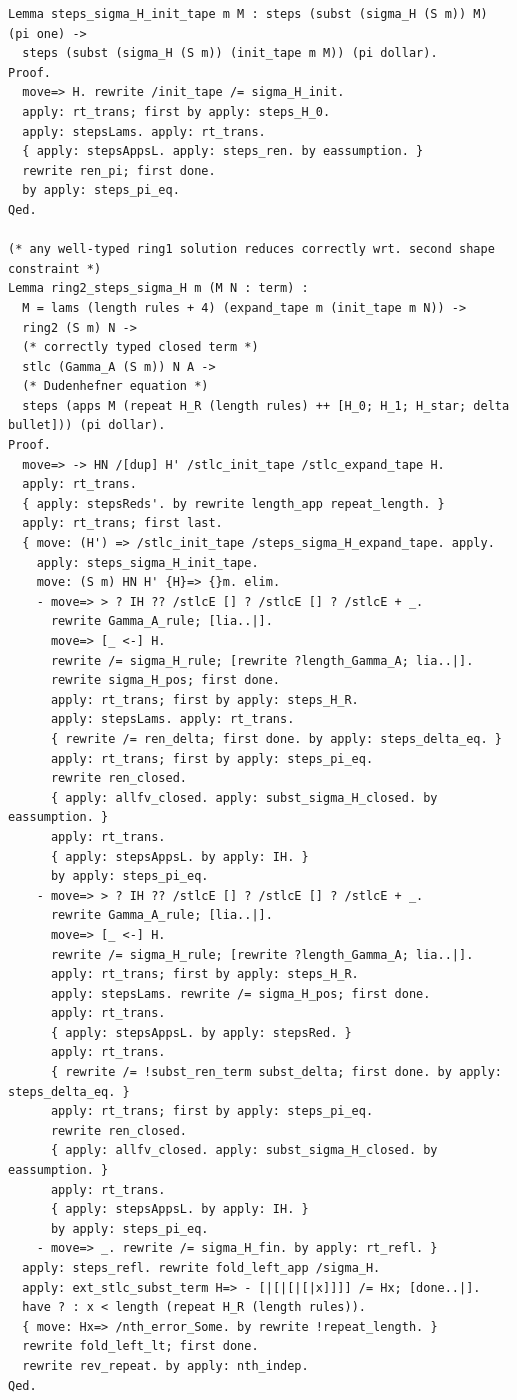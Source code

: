 \documentclass[10pt,a4paper]{amsart}
\begin{document}
\begin{lstlisting}
Lemma steps_sigma_H_init_tape m M : steps (subst (sigma_H (S m)) M) (pi one) ->
  steps (subst (sigma_H (S m)) (init_tape m M)) (pi dollar).
Proof.
  move=> H. rewrite /init_tape /= sigma_H_init.
  apply: rt_trans; first by apply: steps_H_0.
  apply: stepsLams. apply: rt_trans.
  { apply: stepsAppsL. apply: steps_ren. by eassumption. }
  rewrite ren_pi; first done.
  by apply: steps_pi_eq.
Qed.

(* any well-typed ring1 solution reduces correctly wrt. second shape constraint *)
Lemma ring2_steps_sigma_H m (M N : term) :
  M = lams (length rules + 4) (expand_tape m (init_tape m N)) ->
  ring2 (S m) N ->
  (* correctly typed closed term *)
  stlc (Gamma_A (S m)) N A ->
  (* Dudenhefner equation *)
  steps (apps M (repeat H_R (length rules) ++ [H_0; H_1; H_star; delta bullet])) (pi dollar).
Proof.
  move=> -> HN /[dup] H' /stlc_init_tape /stlc_expand_tape H.
  apply: rt_trans.
  { apply: stepsReds'. by rewrite length_app repeat_length. }
  apply: rt_trans; first last.
  { move: (H') => /stlc_init_tape /steps_sigma_H_expand_tape. apply.
    apply: steps_sigma_H_init_tape.
    move: (S m) HN H' {H}=> {}m. elim.
    - move=> > ? IH ?? /stlcE [] ? /stlcE [] ? /stlcE + _.
      rewrite Gamma_A_rule; [lia..|].
      move=> [_ <-] H.
      rewrite /= sigma_H_rule; [rewrite ?length_Gamma_A; lia..|].
      rewrite sigma_H_pos; first done.
      apply: rt_trans; first by apply: steps_H_R.
      apply: stepsLams. apply: rt_trans.
      { rewrite /= ren_delta; first done. by apply: steps_delta_eq. }
      apply: rt_trans; first by apply: steps_pi_eq.
      rewrite ren_closed.
      { apply: allfv_closed. apply: subst_sigma_H_closed. by eassumption. }
      apply: rt_trans.
      { apply: stepsAppsL. by apply: IH. }
      by apply: steps_pi_eq.
    - move=> > ? IH ?? /stlcE [] ? /stlcE [] ? /stlcE + _.
      rewrite Gamma_A_rule; [lia..|].
      move=> [_ <-] H.
      rewrite /= sigma_H_rule; [rewrite ?length_Gamma_A; lia..|].
      apply: rt_trans; first by apply: steps_H_R.
      apply: stepsLams. rewrite /= sigma_H_pos; first done.
      apply: rt_trans.
      { apply: stepsAppsL. by apply: stepsRed. }
      apply: rt_trans.
      { rewrite /= !subst_ren_term subst_delta; first done. by apply: steps_delta_eq. }
      apply: rt_trans; first by apply: steps_pi_eq.
      rewrite ren_closed.
      { apply: allfv_closed. apply: subst_sigma_H_closed. by eassumption. }
      apply: rt_trans.
      { apply: stepsAppsL. by apply: IH. }
      by apply: steps_pi_eq.
    - move=> _. rewrite /= sigma_H_fin. by apply: rt_refl. }
  apply: steps_refl. rewrite fold_left_app /sigma_H.
  apply: ext_stlc_subst_term H=> - [|[|[|[|x]]]] /= Hx; [done..|].
  have ? : x < length (repeat H_R (length rules)).
  { move: Hx=> /nth_error_Some. by rewrite !repeat_length. }
  rewrite fold_left_lt; first done.
  rewrite rev_repeat. by apply: nth_indep.
Qed.


\end{lstlisting}
\end{document}
